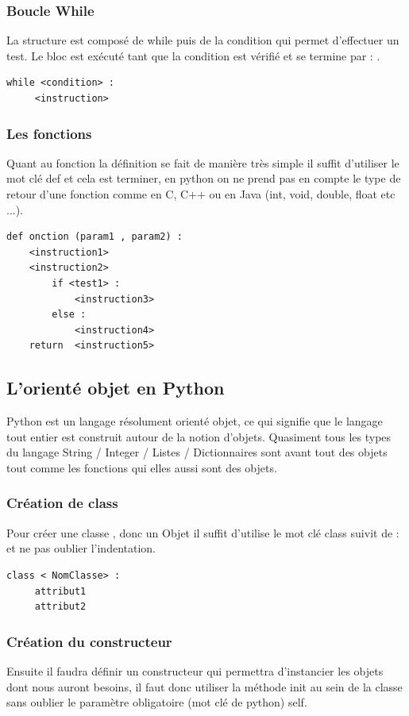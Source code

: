 \documentclass[a4paper, 12pt, twoside]{article}
\begin{document}
\subsubsection{ Boucle While }
La structure est composé de while puis de la condition qui permet d'effectuer un test. Le bloc est exécuté tant que la condition est vérifié et se termine par  : .
\begin{verbatim}
while <condition> :
     <instruction>
\end{verbatim}
\subsubsection{ Les fonctions}
Quant au fonction la définition se fait de manière très simple il suffit d'utiliser le mot clé def et cela est terminer, en python on ne prend pas en compte le type de retour d'une fonction comme en C, C++ ou en Java (int, void, double, float etc ...).
\begin{verbatim}
def onction (param1 , param2) :
    <instruction1>
    <instruction2>
        if <test1> :
            <instruction3>
        else :
            <instruction4>
    return  <instruction5>
\end{verbatim}

\subsection{L'orienté objet en Python}
Python est un langage résolument orienté objet, ce qui signifie que le langage tout entier est construit autour de la notion d’objets. Quasiment tous les types du langage String / Integer / Listes / Dictionnaires  sont avant tout des objets tout comme les fonctions qui elles aussi sont des objets.

\subsubsection{Création de class}{Pour créer une classe , donc un Objet il suffit d'utilise le mot clé class suivit de  :  et ne pas oublier l'indentation.}
\begin{verbatim}
class < NomClasse> : 
     attribut1
     attribut2 
\end{verbatim}

\subsubsection{Création du constructeur}{Ensuite il faudra définir un constructeur qui permettra d'instancier les objets dont nous auront besoins, il faut donc utiliser la méthode  \textsf{init} au sein de la classe sans oublier le paramètre obligatoire (mot clé de python) \textsf{self}. }
\end{document}
